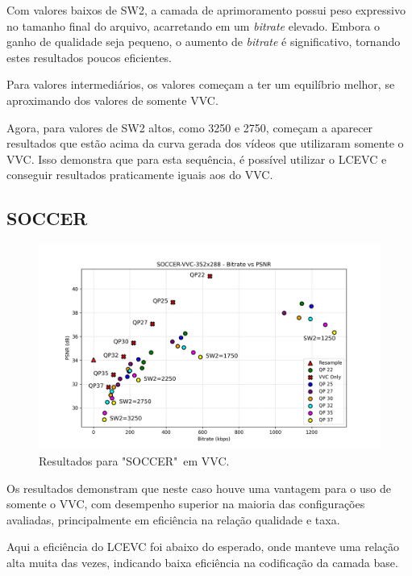 Com valores baixos de SW2, a camada de aprimoramento possui peso expressivo no tamanho final
do arquivo, acarretando em um \textit{bitrate} elevado. Embora o ganho de qualidade seja pequeno, 
o aumento de \textit{bitrate} é significativo, tornando estes resultados poucos eficientes.

Para valores intermediários, os valores começam a ter um equilíbrio melhor, se aproximando dos
valores de somente \acrshort{VVC}.

Agora, para valores de SW2 altos, como 3250 e 2750, começam a aparecer resultados que estão
acima da curva gerada dos vídeos que utilizaram somente o \acrshort{VVC}. Isso demonstra
que para esta sequência, é possível utilizar o \acrshort{LCEVC} e conseguir resultados
praticamente iguais aos do \acrshort{VVC}.

\newpage
\subsection{SOCCER}

\begin{figure}[h]
    \centering
    \includegraphics[width=1.0\textwidth]{img/SOCCER-VVC.png}
    \caption{Resultados para "SOCCER"\ em \acrshort{VVC}. \cite{xiph}}
    \label{fig:Soccer-VVC}
\end{figure}

Os resultados demonstram que neste caso houve uma vantagem para o uso de
somente o \acrshort{VVC}, com desempenho superior na maioria das configurações
avaliadas, principalmente em eficiência na relação qualidade e taxa.

Aqui a eficiência do \acrshort{LCEVC} foi abaixo do esperado, onde manteve
uma relação alta muita das vezes, indicando baixa eficiência na codificação
da camada base.

